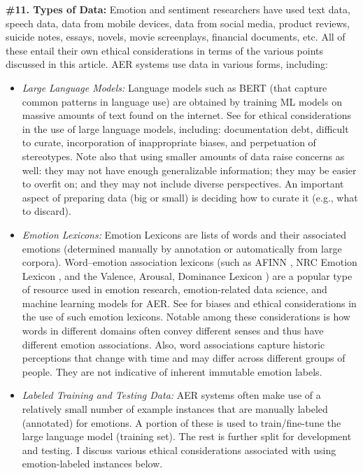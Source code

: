 \documentclass{clv3}
\begin{document}
\noindent \textbf{\#11. Types of Data:} Emotion and sentiment researchers have used text data, speech data, data from mobile devices, data from social media, product reviews, suicide notes, essays, novels, movie screenplays, financial documents, etc. All of these entail their own ethical considerations in terms of the various points discussed in this article. AER systems use data in various forms, including:\\[-20pt]
\begin{itemize} 
    \item \textit{Large Language Models:} Language models such as BERT (that capture common patterns in language use) are obtained by training ML models on massive amounts of text found on the internet. See \citet{bender2021dangers} for ethical considerations in the use of large language models, including: documentation debt, difficult to curate, incorporation of inappropriate biases, and perpetuation of stereotypes. Note also that using smaller amounts of data raise concerns as well: they may not have enough generalizable information; they may be easier to overfit on; and they may not include diverse perspectives. An important aspect of preparing data (big or small) is deciding how to curate it %
    (e.g., what to discard).
    \item \textit{Emotion Lexicons:} Emotion Lexicons are lists of words and their associated emotions (determined manually by annotation or automatically from large corpora). Word--emotion association lexicons (such as AFINN \cite{nielsen2011new}, NRC Emotion Lexicon \cite{Mohammad13}, and the Valence, Arousal, Dominance Lexicon \cite{vad-acl2018}) are a popular type of resource used in emotion research, emotion-related data science, and machine learning models for AER. See \citet{mohammad2020practical} for biases and ethical considerations in the use of such emotion lexicons. Notable among these considerations is how words in different domains often convey different senses and thus have different emotion associations. Also, word associations capture historic perceptions that change with time and may differ across  different groups of people. They are not indicative of inherent immutable emotion labels.
    \item \textit{Labeled Training and Testing Data:} AER systems often make use of a relatively small number of example instances that are manually labeled (annotated) for emotions. A portion of these is used to train/fine-tune the large language model (training set). The rest is further split for development and testing. I discuss various ethical considerations associated with using emotion-labeled instances below.
\end{itemize}
\end{document}
